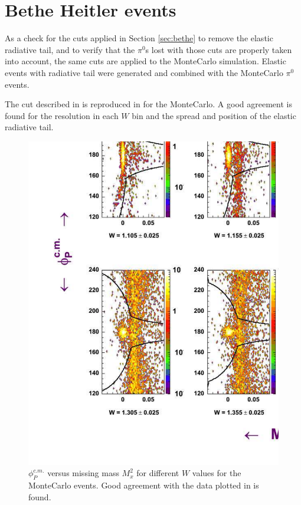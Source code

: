 \section{Bethe Heitler events}
\label{ref:mcbethe}
As a check for the cuts applied in Section \ref{sec:bethe} to remove the elastic radiative tail, 
and to verify that the $\pi^0$s lost with those cuts are properly taken into account, 
the same cuts are applied to the MonteCarlo simulation. Elastic events with radiative
tail were generated and combined with the MonteCarlo $\pi^0$ events.

The cut described in  is reproduced in  for the MonteCarlo.
A good agreement is found for the resolution in each $W$ bin and the spread and position of the elastic
radiative tail.




\begin{figure}[h]
 \begin{center}
 \includegraphics[width = 15.2cm, bb=40 40 1220 980]{acceptance/img/PHMMM} 
  \caption[$\phi_P^{c.m.}$ versus missing mass $M_x^2$ for different $W$ values for the MonteCarlo events]
          { $\phi_P^{c.m.}$ versus missing mass $M_x^2$ for different $W$ values for  
	             the MonteCarlo events. Good agreement with the data plotted in  
		     is found.}
 \label{fig:bethe_gsim}
 \end{center}
\end{figure}


